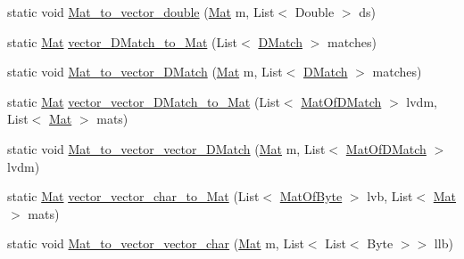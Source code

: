 \begin{DoxyCompactItemize}
\item 
static void \mbox{\hyperlink{classorg_1_1opencv_1_1utils_1_1_converters_a85b1eb91af64803b15f70da3f79743e2}{Mat\+\_\+to\+\_\+vector\+\_\+double}} (\mbox{\hyperlink{classorg_1_1opencv_1_1core_1_1_mat}{Mat}} m, List$<$ Double $>$ ds)
\item 
static \mbox{\hyperlink{classorg_1_1opencv_1_1core_1_1_mat}{Mat}} \mbox{\hyperlink{classorg_1_1opencv_1_1utils_1_1_converters_aa053ba9a3e464c2928c87319dea263bf}{vector\+\_\+\+D\+Match\+\_\+to\+\_\+\+Mat}} (List$<$ \mbox{\hyperlink{classorg_1_1opencv_1_1features2d_1_1_d_match}{D\+Match}} $>$ matches)
\item 
static void \mbox{\hyperlink{classorg_1_1opencv_1_1utils_1_1_converters_ac33a3d22a96ef3a6e271533d7655ab42}{Mat\+\_\+to\+\_\+vector\+\_\+\+D\+Match}} (\mbox{\hyperlink{classorg_1_1opencv_1_1core_1_1_mat}{Mat}} m, List$<$ \mbox{\hyperlink{classorg_1_1opencv_1_1features2d_1_1_d_match}{D\+Match}} $>$ matches)
\item 
static \mbox{\hyperlink{classorg_1_1opencv_1_1core_1_1_mat}{Mat}} \mbox{\hyperlink{classorg_1_1opencv_1_1utils_1_1_converters_a43cb5f913aa19e1d9ac101238e50076c}{vector\+\_\+vector\+\_\+\+D\+Match\+\_\+to\+\_\+\+Mat}} (List$<$ \mbox{\hyperlink{classorg_1_1opencv_1_1core_1_1_mat_of_d_match}{Mat\+Of\+D\+Match}} $>$ lvdm, List$<$ \mbox{\hyperlink{classorg_1_1opencv_1_1core_1_1_mat}{Mat}} $>$ mats)
\item 
static void \mbox{\hyperlink{classorg_1_1opencv_1_1utils_1_1_converters_a32b9db0c7e8c23fc500bb92eb42325cd}{Mat\+\_\+to\+\_\+vector\+\_\+vector\+\_\+\+D\+Match}} (\mbox{\hyperlink{classorg_1_1opencv_1_1core_1_1_mat}{Mat}} m, List$<$ \mbox{\hyperlink{classorg_1_1opencv_1_1core_1_1_mat_of_d_match}{Mat\+Of\+D\+Match}} $>$ lvdm)
\item 
static \mbox{\hyperlink{classorg_1_1opencv_1_1core_1_1_mat}{Mat}} \mbox{\hyperlink{classorg_1_1opencv_1_1utils_1_1_converters_adf11458ae163862fc7737b0db33dd3a0}{vector\+\_\+vector\+\_\+char\+\_\+to\+\_\+\+Mat}} (List$<$ \mbox{\hyperlink{classorg_1_1opencv_1_1core_1_1_mat_of_byte}{Mat\+Of\+Byte}} $>$ lvb, List$<$ \mbox{\hyperlink{classorg_1_1opencv_1_1core_1_1_mat}{Mat}} $>$ mats)
\item 
static void \mbox{\hyperlink{classorg_1_1opencv_1_1utils_1_1_converters_af667bb358466a5f412ef0bd65c03c8b5}{Mat\+\_\+to\+\_\+vector\+\_\+vector\+\_\+char}} (\mbox{\hyperlink{classorg_1_1opencv_1_1core_1_1_mat}{Mat}} m, List$<$ List$<$ Byte $>$$>$ llb)
\end{DoxyCompactItemize}


